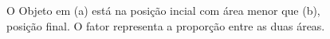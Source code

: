 \begin{figure}[H]
\centering
  \caption{O Objeto em (a) está na posição incial com área menor que (b), 
  posição final. O fator representa a proporção entre as duas áreas.}
  \label{fig:target}
\end{figure}

